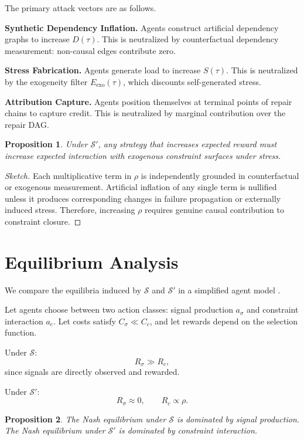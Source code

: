 \documentclass[12pt]{article}
\newtheorem{proposition}{Proposition}
\begin{document}
The primary attack vectors are as follows.

\medskip
\noindent\textbf{Synthetic Dependency Inflation.}
Agents construct artificial dependency graphs to increase $D(\tau)$.
This is neutralized by counterfactual dependency measurement:
non-causal edges contribute zero.

\medskip
\noindent\textbf{Stress Fabrication.}
Agents generate load to increase $S(\tau)$.
This is neutralized by the exogeneity filter $E_{\mathrm{exo}}(\tau)$,
which discounts self-generated stress.

\medskip
\noindent\textbf{Attribution Capture.}
Agents position themselves at terminal points of repair chains to
capture credit. This is neutralized by marginal contribution over the
repair DAG.

\medskip

\begin{proposition}
Under $\mathcal{S}'$, any strategy that increases expected reward must
increase expected interaction with exogenous constraint surfaces under
stress.
\end{proposition}

\begin{proof}[Sketch]
Each multiplicative term in $\rho$ is independently grounded in
counterfactual or exogenous measurement. Artificial inflation of any
single term is nullified unless it produces corresponding changes in
failure propagation or externally induced stress. Therefore, increasing
$\rho$ requires genuine causal contribution to constraint closure.
\end{proof}

\section{Equilibrium Analysis}

We compare the equilibria induced by $\mathcal{S}$ and $\mathcal{S}'$
in a simplified agent model \cite{osborne1994,aumann1974}.

Let agents choose between two action classes: signal production
$a_\sigma$ and constraint interaction $a_c$. Let costs satisfy
$C_\sigma \ll C_c$, and let rewards depend on the selection function.

Under $\mathcal{S}$:
\[
  R_\sigma \gg R_c,
\]
since signals are directly observed and rewarded.

Under $\mathcal{S}'$:
\[
  R_\sigma \approx 0, \qquad R_c \propto \rho.
\]

\begin{proposition}
The Nash equilibrium under $\mathcal{S}$ is dominated by signal
production. The Nash equilibrium under $\mathcal{S}'$ is dominated by
constraint interaction.
\end{proposition}
\end{document}
